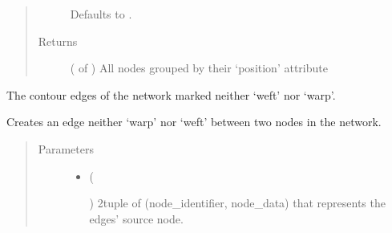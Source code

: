 \documentclass[letterpaper,10pt,english]{sphinxmanual}
\begin{document}
\begin{fulllineitems}
\begin{fulllineitems}
\begin{quote}
\begin{description}
Defaults to .


\item[{Returns}] \leavevmode
{} ( of ) \textendash{} All nodes grouped by their ‘position’ attribute

\end{description}\end{quote}

\end{fulllineitems}


\begin{fulllineitems}
\label{\detokenize{cockatoo:cockatoo.KnitNetworkBase.contour_edges}}
The contour edges of the network marked neither ‘weft’ nor ‘warp’.

\end{fulllineitems}


\begin{fulllineitems}
\label{\detokenize{cockatoo:cockatoo.KnitNetworkBase.create_contour_edge}}
Creates an edge neither ‘warp’ nor ‘weft’ between two nodes in the
network.
\begin{quote}\begin{description}
\item[{Parameters}] \leavevmode\begin{itemize}
\item {} 
 (%
\begin{footnote}[73]\sphinxAtStartFootnote
{}
%
\end{footnote}) \textendash{} 2\sphinxhyphen{}tuple of (node\_identifier, node\_data) that represents the edges’
source node.


\end{itemize}
\end{description}
\end{quote}
\end{fulllineitems}
\end{fulllineitems}
\end{document}
